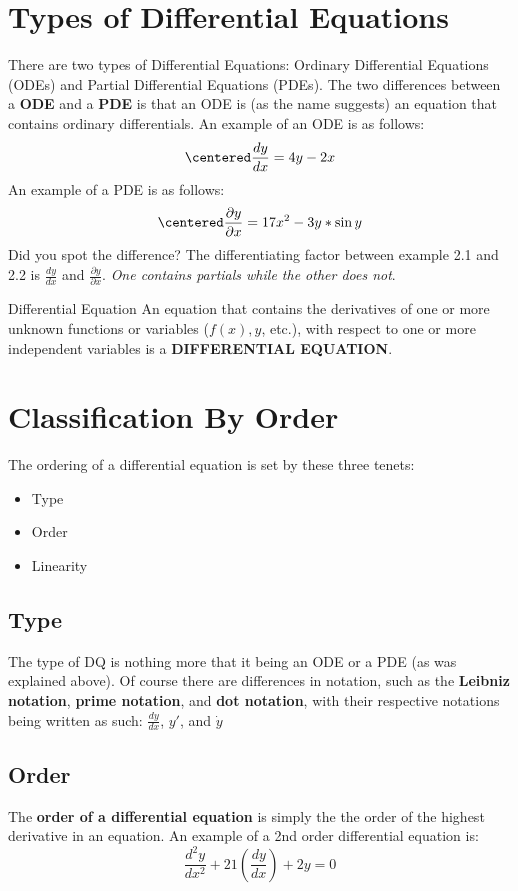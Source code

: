 \documentclass[letter, 11pt]{book}
\begin{document}
\section{Types of Differential Equations}
There are two types of Differential Equations: Ordinary Differential Equations (ODEs) and Partial Differential Equations (PDEs).
The two differences between a \textbf{ODE} and a \textbf{PDE} is that an ODE is (as the name suggests) an equation that contains ordinary differentials. An example of an ODE is as follows:
\begin{equation}\label{Ex. 1}
\centered
\frac{dy}{dx} = 4y - 2x
\end{equation}
An example of a PDE is as follows:
\begin{equation}\label{Ex. 2}
\centered
\frac{\partial y}{\partial x} = 17x^2 -3y*\sin{y}
\end{equation}
Did you spot the difference? The differentiating factor between example 2.1 and 2.2 is $\frac{dy}{dx}$ and $\frac{\partial y}{\partial x}$. \textit{One contains partials while the other does not}.
\begin{definition}{Differential Equation}{}
	An equation that contains the derivatives of one or more unknown functions or variables ($f(x), y$, etc.), with respect to one or more independent variables is a \textbf{DIFFERENTIAL EQUATION}.
\end{definition}

\section{Classification By Order}
	The ordering of a differential equation is set by these three tenets:
\begin{itemize}
	\item Type
	\item Order
	\item Linearity
\end{itemize}
\subsection{Type}
The type of DQ is nothing more that it being an ODE or a PDE (as was explained above).
Of course there are differences in notation, such as the \textbf{Leibniz notation}, \textbf{prime notation}, and \textbf{dot notation}, with their respective notations being written as such: $\frac{dy}{dx}$, $y'$, and $\dot y$
\subsection{Order}
The \textbf{order of a differential equation} is simply the the order of the highest derivative in an equation.
An example of a 2nd order differential equation is:
\begin{equation}\label{2ndordereq}
	\frac{d^2y}{dx^2} + 21(\frac{dy}{dx}) + 2y = 0 
\end{equation}
\end{document}
